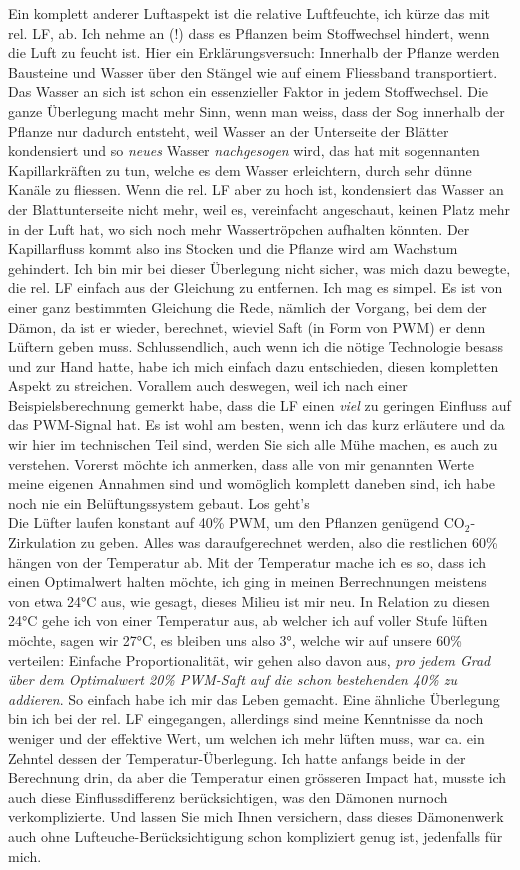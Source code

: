 \documentclass[12pt,titlepage,a4paper]{article}
\begin{document}
Ein komplett anderer Luftaspekt ist die relative Luftfeuchte, ich kürze das mit rel. LF, ab. Ich nehme an (!) dass es Pflanzen beim Stoffwechsel hindert, wenn die Luft zu feucht ist. Hier ein Erklärungsversuch: Innerhalb der Pflanze werden Bausteine und Wasser über den Stängel wie auf einem Fliessband transportiert. Das Wasser an sich ist schon ein essenzieller Faktor in jedem Stoffwechsel. Die ganze Überlegung macht mehr Sinn, wenn man weiss, dass der Sog innerhalb der Pflanze nur dadurch entsteht, weil Wasser an der Unterseite der Blätter kondensiert und so \textit{neues} Wasser \textit{nachgesogen} wird, das hat mit sogennanten Kapillarkräften zu tun, welche es dem Wasser erleichtern, durch sehr dünne Kanäle zu fliessen. Wenn die rel. LF aber zu hoch ist, kondensiert das Wasser an der Blattunterseite nicht mehr, weil es, vereinfacht angeschaut, keinen Platz mehr in der Luft hat, wo sich noch mehr Wassertröpchen aufhalten könnten. Der Kapillarfluss kommt also ins Stocken und die Pflanze wird am Wachstum gehindert. Ich bin mir bei dieser Überlegung nicht sicher, was mich dazu bewegte, die rel. LF einfach aus der Gleichung zu entfernen. Ich mag es simpel. Es ist von einer ganz bestimmten Gleichung die Rede, nämlich der Vorgang, bei dem der Dämon, da ist er wieder, berechnet, wieviel Saft (in Form von PWM) er denn Lüftern geben muss. Schlussendlich, auch wenn ich die nötige Technologie besass und zur Hand hatte, habe ich mich einfach dazu entschieden, diesen kompletten Aspekt zu streichen. Vorallem auch deswegen, weil ich nach einer Beispielsberechnung gemerkt habe, dass die LF einen \textit{viel} zu geringen Einfluss auf das PWM-Signal hat. Es ist wohl am besten, wenn ich das kurz erläutere und da wir hier im technischen Teil sind, werden Sie sich alle Mühe machen, es auch zu verstehen. Vorerst möchte ich anmerken, dass alle von mir genannten Werte meine eigenen Annahmen sind und womöglich komplett daneben sind, ich habe noch nie ein Belüftungssystem gebaut. Los geht's\\Die Lüfter laufen konstant auf 40\% PWM, um den Pflanzen genügend CO$ _{2} $-Zirkulation zu geben. Alles was daraufgerechnet werden, also die restlichen 60\% hängen von der Temperatur ab. Mit der Temperatur mache ich es so, dass ich einen Optimalwert halten möchte, ich ging in meinen Berrechnungen meistens von etwa 24°C aus, wie gesagt, dieses Milieu ist mir neu. In Relation zu diesen 24°C gehe ich von einer Temperatur aus, ab welcher ich auf voller Stufe lüften möchte, sagen wir 27°C, es bleiben uns also 3°, welche wir auf unsere 60\% verteilen: Einfache Proportionalität, wir gehen also davon aus, \textit{pro jedem Grad über dem Optimalwert 20\% PWM-Saft auf die schon bestehenden 40\% zu addieren}. So einfach habe ich mir das Leben gemacht. Eine ähnliche Überlegung bin ich bei der rel. LF eingegangen, allerdings sind meine Kenntnisse da noch weniger und der effektive Wert, um welchen ich mehr lüften muss, war ca. ein Zehntel dessen der Temperatur-Überlegung. Ich hatte anfangs beide in der Berechnung drin, da aber die Temperatur einen grösseren Impact hat, musste ich auch diese Einflussdifferenz berücksichtigen, was den Dämonen nurnoch verkomplizierte. Und lassen Sie mich Ihnen versichern, dass dieses Dämonenwerk auch ohne Lufteuche-Berücksichtigung schon kompliziert genug ist, jedenfalls für mich.
\end{document}
